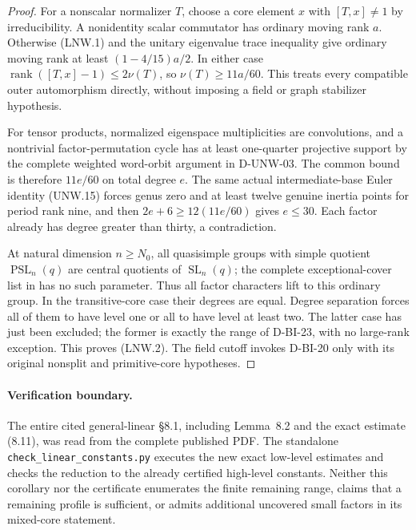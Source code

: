 \begin{proof}
For a nonscalar normalizer $T$, choose a core element $x$ with
$[T,x]\ne1$ by irreducibility. A nonidentity scalar commutator
has ordinary moving rank $a$. Otherwise (LNW.1) and the unitary
eigenvalue trace inequality give ordinary moving rank at least
$(1-4/15)a/2$. In either case
$\operatorname{rank}([T,x]-1)\le2\nu(T)$, so
$\nu(T)\ge11a/60$. This treats every compatible outer
automorphism directly, without imposing a field or graph
stabilizer hypothesis.

For tensor products, normalized eigenspace multiplicities are
convolutions, and a nontrivial factor-permutation cycle has at
least one-quarter projective support by the complete weighted
word-orbit argument in D-UNW-03. The common bound is therefore
$11e/60$ on total degree $e$. The same actual intermediate-base
Euler identity (UNW.15) forces genus zero and at least twelve
genuine inertia points for period rank nine, and then
$2e+6\ge12(11e/60)$ gives $e\le30$. Each factor already has
degree greater than thirty, a contradiction.

At natural dimension $n\ge N_0$, all quasisimple groups with
simple quotient $\operatorname{PSL}_n(q)$ are central quotients
of $\operatorname{SL}_n(q)$; the complete exceptional-cover list
in \cite[Chapter~5, Table~1, p.~35]{BI:HHM} has no such parameter.
Thus all factor characters lift to this ordinary group. In the
transitive-core case their degrees are equal. Degree separation
forces all of them to have level one or all to have level at least
two. The latter case has just been excluded; the former is exactly
the range of D-BI-23, with no large-rank exception. This proves
(LNW.2). The field cutoff invokes D-BI-20 only with its original
nonsplit and primitive-core hypotheses.
\end{proof}

\paragraph{Verification boundary.}
The entire cited general-linear \S8.1, including Lemma~8.2 and
the exact estimate (8.11), was read from the complete published PDF.
The standalone \texttt{check\_linear\_constants.py} executes the
new exact low-level estimates and checks the reduction to the already
certified high-level constants. Neither this corollary nor the
certificate enumerates the finite remaining range, claims that a
remaining profile is sufficient, or admits additional uncovered
small factors in its mixed-core statement.
